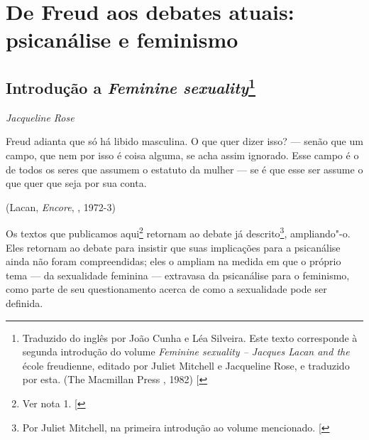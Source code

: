 \part{De Freud aos debates atuais:\\ psicanálise e feminismo}


\chapter*{Introdução a \emph{Feminine sexuality}\footnote{Traduzido
  do inglês por João Cunha e Léa Silveira. Este texto corresponde à
  segunda introdução do volume \emph{Feminine sexuality -- Jacques Lacan
  and the} école freudienne, editado por Juliet Mitchell e
  Jacqueline Rose, e traduzido por esta. (The Macmillan Press , 1982)
  {[}\versal{N.~T.}{]}}}

\begin{flushright}
\emph{Jacqueline Rose}
\end{flushright}

\epigraph{Freud adianta que só há libido masculina. O que quer dizer isso? ---
senão que um campo, que nem por isso é coisa alguma, se acha assim
ignorado. Esse campo é o de todos os seres que assumem o estatuto da
mulher --- se é que esse ser assume o que quer que seja por sua conta.}{(Lacan, \emph{Encore}, , 1972-3)}

Os textos que publicamos aqui\footnote{Ver nota 1. {[}\versal{N.~T.}{]}} retornam
ao debate já descrito\footnote{Por Juliet Mitchell, na primeira
  introdução ao volume mencionado. {[}\versal{N.~T.}{]}}, ampliando"-o. Eles
retornam ao debate para insistir que suas implicações para a psicanálise
ainda não foram compreendidas; eles o ampliam na medida em que o próprio
tema --- da sexualidade feminina --- extravasa da psicanálise para o
feminismo, como parte de seu questionamento acerca de como a sexualidade
pode ser definida.

